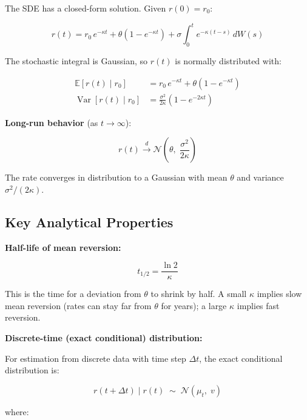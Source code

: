 \documentclass[11pt, letterpaper]{article}
\begin{document}
The SDE has a closed-form solution. Given $r(0) = r_0$:

\begin{equation}
  r(t) = r_0\,e^{-\kappa t} + \theta\!\left(1 - e^{-\kappa t}\right)
         + \sigma\int_0^t e^{-\kappa(t-s)}\,dW(s)
\end{equation}

The stochastic integral is Gaussian, so $r(t)$ is normally distributed with:

\begin{align}
  \mathbb{E}[r(t) \mid r_0]   &= r_0\,e^{-\kappa t} + \theta\!\left(1 - e^{-\kappa t}\right) \\[4pt]
  \operatorname{Var}[r(t) \mid r_0] &= \frac{\sigma^2}{2\kappa}\!\left(1 - e^{-2\kappa t}\right)
\end{align}

\noindent\textbf{Long-run behavior} (as $t \to \infty$):

\begin{equation}
  r(t) \xrightarrow{\;d\;} \mathcal{N}\!\left(\theta,\; \frac{\sigma^2}{2\kappa}\right)
\end{equation}

The rate converges in distribution to a Gaussian with mean $\theta$ and
variance $\sigma^2/(2\kappa)$.

\subsection{Key Analytical Properties}

\textbf{Half-life of mean reversion:}

\begin{equation}
  t_{1/2} = \frac{\ln 2}{\kappa}
\end{equation}

This is the time for a deviation from $\theta$ to shrink by half. A small $\kappa$
implies slow mean reversion (rates can stay far from $\theta$ for years); a large
$\kappa$ implies fast reversion.

\textbf{Discrete-time (exact conditional) distribution:}

For estimation from discrete data with time step $\Delta t$, the exact
conditional distribution is:

\begin{equation}
  r(t + \Delta t) \mid r(t) \;\sim\; \mathcal{N}(\mu_t,\; v)
\end{equation}

where:
\end{document}

